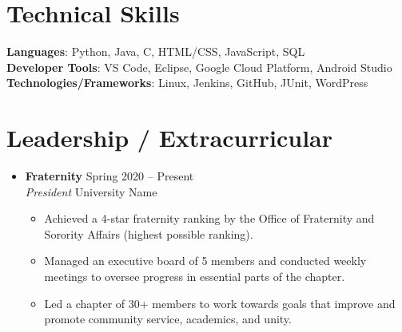 \documentclass[letterpaper,5pt]{article}
\begin{document}
    \section{Technical Skills}
    \begin{itemize}[leftmargin=0.15in, label={}]
        \small{\item{
            \textbf{Languages}{: Python, Java, C, HTML/CSS, JavaScript, SQL} \\
            \textbf{Developer Tools}{: VS Code, Eclipse, Google Cloud Platform, Android Studio} \\
            \textbf{Technologies/Frameworks}{: Linux, Jenkins, GitHub, JUnit, WordPress} \\
        }}
    \end{itemize}
    \vspace{-16pt}
    
    \section{Leadership / Extracurricular}
    \begin{itemize}
        \item[]
            \textbf{Fraternity} \hfill Spring 2020 -- Present \\
            \textit{President} \hfill University Name
            \begin{itemize}
                \item[\textbullet] Achieved a 4-star fraternity ranking by the Office of Fraternity and Sorority Affairs (highest possible ranking).
                \item[\textbullet] Managed an executive board of 5 members and conducted weekly meetings to oversee progress in essential parts of the chapter.
                \item[\textbullet] Led a chapter of 30+ members to work towards goals that improve and promote community service, academics, and unity.
            \end{itemize}
    \end{itemize}
    
\end{document}
